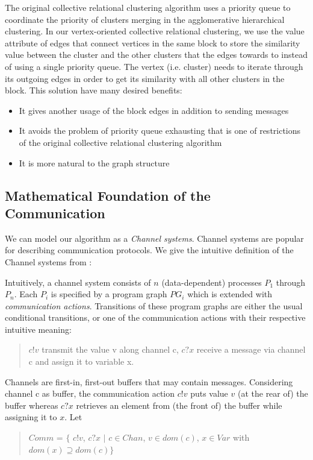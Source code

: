 The original collective relational clustering algorithm uses a priority queue to coordinate the priority of clusters merging in the agglomerative hierarchical clustering. In our vertex-oriented collective relational clustering, we use the value attribute of edges that connect vertices in the same block to store the similarity value between the cluster and the other clusters that the edges towards to instead of using a single priority queue. The vertex (i.e. cluster) needs to iterate through its outgoing edges in order to get its similarity with all other clusters in the block. This solution have many desired benefits:
\begin{itemize}
\item It gives another usage of the block edges in addition to sending messages
\item It avoids the problem of priority queue exhausting that is one of restrictions of the original collective relational clustering algorithm
\item It is more natural to the graph structure 
\end{itemize}
    
\subsection{Mathematical Foundation of the Communication}
We can model our algorithm as a \textit{Channel systems}\cite{BaKa08}. Channel systems are popular for describing communication protocols. We give the intuitive definition of the Channel systems from \cite{BaKa08}: 


Intuitively, a channel system consists of $n$ (data-dependent) processes $P_1$ through $P_n$.
Each $P_i$ is specified by a program graph $PG_i$ which is extended with \textit{communication
actions}. Transitions of these program graphs are either the usual conditional transitions, or one of the communication actions with their respective intuitive meaning:
\begin{quote}
$c!v$ transmit the value v along channel c,
\newline
$c?x$ receive a message via channel c and assign it to variable x.
\end{quote}
Channels are first-in, first-out buffers that may contain messages. Considering channel c as buffer, the communication action $c!v$ puts value $v$ (at the rear of) the buffer whereas $c?x$ retrieves an element from (the front of) the buffer while assigning it to $x$. Let

\begin{quote}
$Comm$ = $\lbrace$ $c!v$, $c?x$ $|$ $c \in Chan$, $v \in dom(c)$, $x \in Var$ with $dom(x) \supseteq dom(c)\rbrace$
\end{quote}

